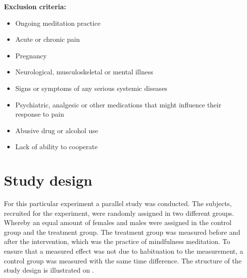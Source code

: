 \textbf{Exclusion criteria:}
\vspace{-.5cm}
\begin{itemize}
	\item Ongoing meditation practice 
	\vspace{-.3cm}
	\item Acute or chronic pain
	\vspace{-.3cm}
	\item Pregnancy 
	\vspace{-.3cm}
	\item Neurological, musculoskeletal or mental illness
	\vspace{-.3cm}
	\item Signs or symptoms of any serious systemic diseases 
	\vspace{-.3cm}
	\item Psychiatric, analgesic or other medications that might influence their response to pain 
		\vspace{-.3cm}
	\item Abusive drug or alcohol use
		\vspace{-.3cm}
	\item Lack of ability to cooperate
\end{itemize}

\vspace{-.5cm}

\section{Study design} 
For this particular experiment a parallel study was conducted. The subjects, recruited for the experiment, were randomly assigned in two different groups. Whereby an equal amount of females and males were assigned in the control group and the treatment group. The treatment group was measured before and after the intervention, which was the practice of mindfulness meditation. To ensure that a measured effect was not due to habituation to the measurement, a control group was measured with the same time difference. The structure of the study design is illustrated on .

